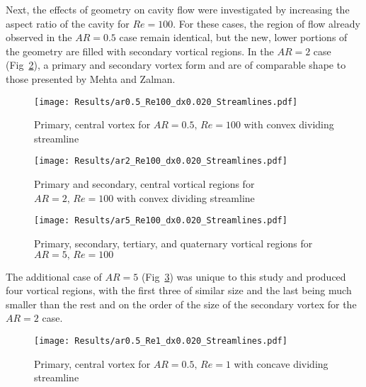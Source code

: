 \documentclass[twocolumn,10pt]{asme2ej}
\begin{document}
Next, the effects of geometry on cavity flow were investigated by increasing the aspect ratio of the cavity for $Re=100$.  For these cases, the region of flow already observed in the $AR=0.5$ case remain identical, but the new, lower portions of the geometry are filled with secondary vortical regions.  In the $AR=2$ case (Fig~\ref{AR2Re100}), a primary and secondary vortex form and are of comparable shape to those presented by Mehta and Zalman.

\clearpage

\begin{figure}[p!]
\begin{center}
\texttt{[image: Results/ar0.5\_Re100\_dx0.020\_Streamlines.pdf]}
\caption{Primary, central vortex for $AR=0.5,\,Re=100$ with convex dividing streamline}
\label{AR0.5Re100}
\end{center}
\end{figure}

\begin{figure}[p!]
\begin{center}
\texttt{[image: Results/ar2\_Re100\_dx0.020\_Streamlines.pdf]}
\caption{Primary and secondary, central vortical regions for $AR=2,\,Re=100$ with convex dividing streamline}
\label{AR2Re100}
\end{center}
\end{figure}

\begin{figure}[p!]
\begin{center}
\texttt{[image: Results/ar5\_Re100\_dx0.020\_Streamlines.pdf]}
\caption{Primary, secondary, tertiary, and quaternary vortical regions for $AR=5,\,Re=100$}
\label{AR5Re100}
\end{center}
\end{figure}

\clearpage
The additional case of $AR=5$ (Fig~\ref{AR5Re100}) was unique to this study and produced four vortical regions, with the first three of similar size and the last being much smaller than the rest and on the order of the size of the secondary vortex for the $AR=2$ case.

\begin{figure}[htb]
\begin{center}
\texttt{[image: Results/ar0.5\_Re1\_dx0.020\_Streamlines.pdf]}
\caption{Primary, central vortex for $AR=0.5,\,Re=1$ with concave dividing streamline}
\label{AR0.5Re1}
\end{center}
\end{figure}
\end{document}
